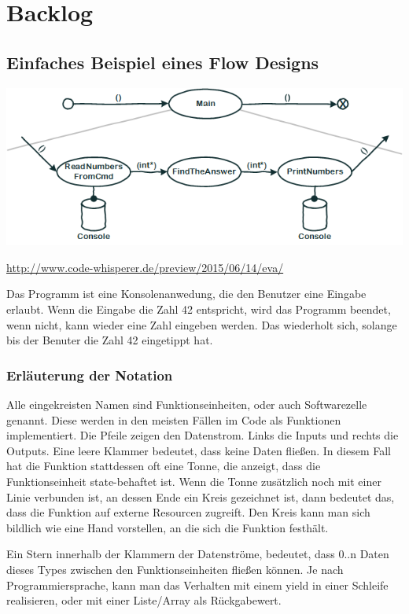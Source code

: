 \documentclass[11pt]{article}
\begin{document}
\section{Backlog}
\label{sec:orgheadline55}
\subsection{Einfaches Beispiel eines Flow Designs}
\label{sec:orgheadline54}

\includegraphics[width=.9\linewidth]{./img/FlowDesign2.png}

\url{http://www.code-whisperer.de/preview/2015/06/14/eva/}

Das Programm ist eine Konsolenanwedung, die den Benutzer eine Eingabe erlaubt.
Wenn die Eingabe die Zahl 42 entspricht, wird das Programm beendet, wenn nicht, kann wieder eine Zahl eingeben werden.
Das wiederholt sich, solange bis der Benuter die Zahl 42 eingetippt hat.

\subsubsection{Erläuterung der Notation}
\label{sec:orgheadline51}
Alle eingekreisten Namen sind Funktionseinheiten, oder auch Softwarezelle genannt.
Diese werden in den meisten Fällen im Code als Funktionen implementiert.
Die Pfeile zeigen den Datenstrom. Links die Inputs und rechts die Outputs.
Eine leere Klammer bedeutet, dass keine Daten fließen.
In diesem Fall hat die Funktion stattdessen oft eine Tonne, die anzeigt, dass die Funktionseinheit state-behaftet ist.
Wenn die Tonne zusätzlich noch mit einer Linie verbunden ist, an dessen Ende ein Kreis gezeichnet ist,
dann bedeutet das, dass die Funktion auf externe Resourcen zugreift.
Den Kreis kann man sich bildlich wie eine Hand vorstellen, an die sich die Funktion festhält.

Ein Stern innerhalb der Klammern der Datenströme, bedeutet, dass 0..n Daten dieses Types zwischen
den Funktionseinheiten fließen können.
Je nach Programmiersprache, kann man das Verhalten mit einem yield in einer Schleife realisieren,
oder mit einer Liste/Array als Rückgabewert.
\end{document}

